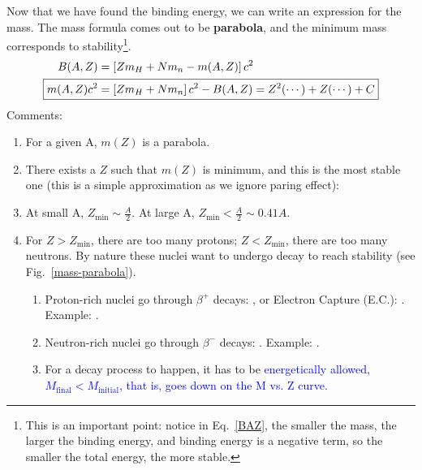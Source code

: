 \documentclass{school-22.101-notes}
\date{November 14, 2011}
\begin{document}
\maketitle




Now that we have found the binding energy, we can write an expression for the mass. The mass formula comes out to be \textbf{parabola}, and the minimum mass corresponds to stability\footnote{This is an important point: notice in Eq.~\ref{BAZ}, the smaller the mass, the larger the binding energy, and binding energy is a negative term, so the smaller the total energy, the more stable. }.
\begin{align}
B(A,Z) &= \left[ Z m_H + N m_n - m(A,Z) \right] c^2  \label{BAZ}\\
\Aboxed{ m(A,Z) c^2 &= \left[ Z m_H + N m_n \right] c^2 - B(A,Z) = Z^2 (\cdots) + Z(\cdots) + C  }
\end{align}
Comments:
\begin{enumerate}
\item For a given A, $m(Z)$ is a parabola.

\item There exists a $Z$ such that $m(Z)$ is minimum, and this is the most stable one (this is a simple approximation as we ignore paring effect): 

\item At small A, $Z_{\mathrm{min}} \sim \frac{A}{2}$. At large A, $Z_{\mathrm{min}} < \frac{A}{2} \sim 0.41 A$. 

\item For $Z > Z_{\mathrm{min}}$, there are too many protons; $Z < Z_{\mathrm{min}}$, there are too many neutrons. By nature these nuclei want to undergo decay to reach stability (see Fig.~\ref{mass-parabola}). 
  \begin{enumerate}
  \item Proton-rich nuclei go through $\beta^+$ decays: , or Electron Capture (E.C.): . Example: . 
  \item Neutron-rich nuclei go through $\beta^-$ decays: . Example: .
  \item For a decay process to happen, it has to be \textcolor{blue}{energetically allowed, $M_{\mathrm{final}} < M_{\mathrm{initial}}$, that is, goes down on the M vs. Z curve.}
  \end{enumerate}
\end{enumerate}
\end{document}
